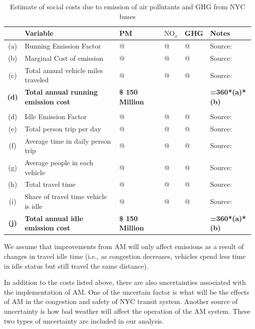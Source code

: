 \documentclass[11pt, letterpaper]{article}
\begin{document}
\begin{enumerate}[leftmargin=*]
\begin{table}[h]
\caption{Estimate of social costs due to emission of air pollutants and GHG from NYC buses}
\vspace{0.2em}
\centering
\footnotesize 
\renewcommand{\arraystretch}{1.1}
\begin{tabular}{c p{10em} p{7em} p{7em} p{7em} l}
\hline
 	& Variable 							& PM 	& $\mbox{NO}_x$	& GHG		& Notes 						\\\hline\hline
(a)	& Running Emission Factor				& @		& @				& @			& Source:						\\
(b)	& Marginal Cost of emission				& @		& @				& @			& Source:						\\
(c)	& Total annual vehicle miles traveled			& @		& @				& @			& Source:						\\
\textbf{(d)}	& \textbf{Total annual running emission cost}		& \textbf{\$ 150 Million} & 		& 			& \textbf{=360*(a)*(b)}			\\
\\
(d)	& Idle Emission Factor					& @		& @				& @			& Source:						\\
(e)	& Total person trip per day					& @		& @				& @			& Source:						\\
(f)	& Average time in daily person trip			& @		& @				& @			& Source:						\\
(g)	& Average people in each vehicle			& @		& @				& @			& Source:						\\
(h)	& Total travel time						& @		& @				& @			& Source:						\\
(i)	& Share of travel time vehicle is idle			& @		& @				& @			& Source:						\\
\textbf{(j)}	& \textbf{Total annual idle emission cost}		& \textbf{\$ 150 Million} & 		& 			& \textbf{=360*(a)*(b)}			\\\hline
\end{tabular}
\label{tab:emission.cost}
\end{table}%
    
  We assume that improvements from AM will only affect emissions as a result of changes in travel idle time 
  (i.e., as congestion decreases, vehicles spend less time in idle status but still travel the same distance).
  
\end{enumerate}

In addition to the costs listed above, there are also uncertainties associated 
with the implementation of AM. One of the uncertain factor is what will be the effects
of AM in the congestion and safety of NYC transit system. Another source of 
uncertainty is how bad weather will affect the operation of the AM system. These two
types of uncertainty are included in our analysis.
\end{document}
